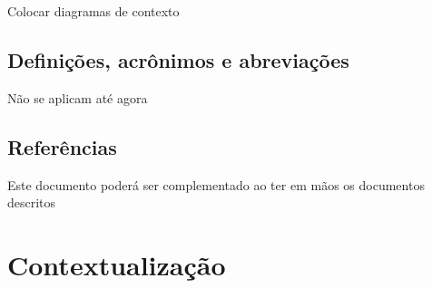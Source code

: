 \documentclass[12pt, a4paper]{article}
\begin{document}
        {\color{red} Colocar diagramas de contexto}

        \subsection{Definições, acrônimos e abreviações}
        {\color{red} Não se aplicam até agora}

        \subsection{Referências}
        {\color{red} Este documento poderá ser complementado ao ter em mãos os
        documentos descritos}

    \section{Contextualização}
\end{document}
